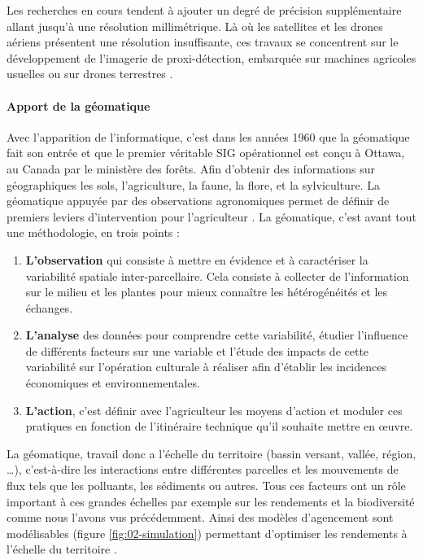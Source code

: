 \documentclass[../thesis.tex]{subfiles}
\begin{document}
    Les recherches en cours tendent à ajouter un degré de précision supplémentaire allant jusqu'à une résolution millimétrique. Là où les satellites et les drones aériens présentent une résolution insuffisante, ces travaux se concentrent sur le développement de l'imagerie de proxi-détection, embarquée sur machines agricoles usuelles ou sur drones terrestres \cite{machleb2020sensor}.
    
    \newpage
    \paragraph{Apport de la géomatique} Avec l'apparition de l'informatique, c'est dans les années 1960 que la géomatique fait son entrée et que le premier véritable SIG opérationnel est conçu à Ottawa, au Canada par le ministère des forêts. Afin d'obtenir des informations sur géographiques les sols, l'agriculture, la faune, la flore, et la sylviculture. La géomatique appuyée par des observations agronomiques permet de définir de premiers leviers d'intervention pour l'agriculteur \cite{lherbier2005valorisation}. La géomatique, c'est avant tout une méthodologie, en trois points :
    
    \begin{enumerate}[noitemsep]
        \item \textbf{L'observation} qui consiste à mettre en évidence et à caractériser la variabilité spatiale inter-parcellaire. Cela consiste à collecter de l'information sur le milieu et les plantes pour mieux connaître les hétérogénéités et les échanges.
        \item \textbf{L'analyse} des données pour comprendre cette variabilité, étudier l'influence de différents facteurs sur une variable et l'étude des impacts de cette variabilité sur l'opération culturale à réaliser afin d'établir les incidences économiques et environnementales.
        \item \textbf{L'action}, c'est définir avec l'agriculteur les moyens d'action et moduler ces pratiques en fonction de l'itinéraire technique qu'il souhaite mettre en œuvre.
    \end{enumerate}
    
    La géomatique, travail donc a l'échelle du territoire (bassin versant, vallée, région, \dots), c'est-à-dire les interactions entre différentes parcelles et les mouvements de flux tels que les polluants, les sédiments ou autres. Tous ces facteurs ont un rôle important à ces grandes échelles par exemple sur les rendements et la biodiversité comme nous l'avons vus précédemment. Ainsi des modèles d'agencement sont modélisables (figure \ref{fig:02-simulation}) permettant d'optimiser les rendements à l'échelle du territoire \cite{caquet2020agroecologie}. 
    
\end{document}
